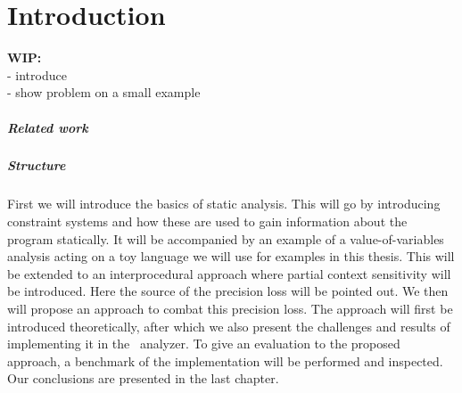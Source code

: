 
\chapter{Introduction}\label{chapter:introduction}
  \textbf{WIP:}\\
  - introduce \gob\\
  - show problem on a small example

\paragraph{Related work}

\paragraph{Structure} 
First we will introduce the basics of static analysis. This will go by introducing constraint systems and how these are used to gain information about the program statically. It will be accompanied by an example of a value-of-variables analysis acting on a toy language we will use for examples in this thesis. This will be extended to an interprocedural approach where partial context sensitivity will be introduced. Here the source of the precision loss will be pointed out. We then will propose an approach to combat this precision loss. The approach will first be introduced theoretically, after which we also present the challenges and results of implementing it in the \gob\ analyzer. To give an evaluation to the proposed approach, a benchmark of the implementation will be performed and inspected. Our conclusions are presented in the last chapter.

